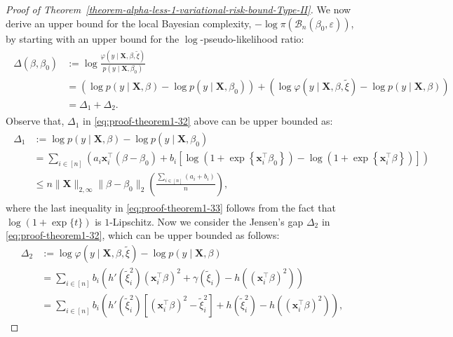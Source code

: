 \documentclass[10pt,a4paper]{amsart}
\begin{document}
\begin{proof}[Proof of Theorem~\ref{theorem-alpha-less-1-variational-risk-bound-Type-II}]
%
We now derive an upper bound for the local Bayesian complexity, $-\log \pi(\mathcal{B}_n(\beta_0, \varepsilon))$, by starting with an upper bound for the $\log$-pseudo-likelihood ratio:
\begin{align}\label{eq:proof-theorem1-32}
    \begin{split}
        \Delta(\beta, \beta_0) &:= \log \frac{\varphi(y\mid \mathbf{X}, \beta, \tilde{\xi})}{p(y\mid \mathbf{X}, \beta_0)}\\
        &= \left(\log p(y\mid \mathbf{X}, \beta) - \log p(y\mid \mathbf{X}, \beta_0)\right) + \left(\log \varphi(y\mid \mathbf{X}, \beta, \tilde{\xi}) - \log p(y\mid \mathbf{X}, \beta)\right)\\
        &= \Delta_1 +\Delta_2.
    \end{split}
\end{align}
Observe that, $\Delta_1$ in \eqref{eq:proof-theorem1-32} above can be upper bounded as:
\begin{align}\label{eq:proof-theorem1-33}
\begin{split}
        \Delta_1 &:= \log p(y\mid \mathbf{X}, \beta) - \log p(y\mid \mathbf{X}, \beta_{0})\\
        &= \sum_{i \in [n]}\left(a_i\mathbf{x}_i^{\top}(\beta-\beta_0) + b_i\left[\log\left(1 + \exp\left\{\mathbf{x}_i^\top\beta_0\right\}\right) - \log\left(1 + \exp\left\{\mathbf{x}_i^\top\beta\right\}\right)\right]\right)\\
        &\leq n\lVert \mathbf{X}\rVert_{2, \infty}\lVert \beta-\beta_0\rVert_2\left(\frac{\sum_{i\in [n]} (a_i+b_i)}{n}\right),
\end{split}
\end{align}
where the last inequality in \eqref{eq:proof-theorem1-33} follows from the fact that $\log(1 + \exp\{t\})$ is $1$-Lipschitz.
Now we consider the Jensen's gap $\Delta_2$ in \eqref{eq:proof-theorem1-32}, which can be upper bounded as follows:
\begin{equation}\label{eq:proof-theorem1-34}
    \begin{split}
        \Delta_2 &:= \log \varphi(y\mid \mathbf{X}, \beta, \tilde{\xi}) - \log p(y\mid \mathbf{X}, \beta)\\
        &= \sum_{i\in [n]} b_i\left(h'(\tilde{\xi}_i^2) (\mathbf{x}_i^{\top}\beta)^2 + \gamma(\tilde{\xi}_i) - h((\mathbf{x}_i^{\top}\beta)^2)\right)\\
        &= \sum_{i\in [n]}b_i\left(h'(\tilde{\xi}_i^2)\left[(\mathbf{x}_i^{\top}\beta)^2 - \tilde{\xi}_i^2\right] + h(\tilde{\xi}_i^2) - h((\mathbf{x}_i^{\top}\beta)^2)\right),

\end{split}
\end{equation}
\end{proof}
\end{document}
